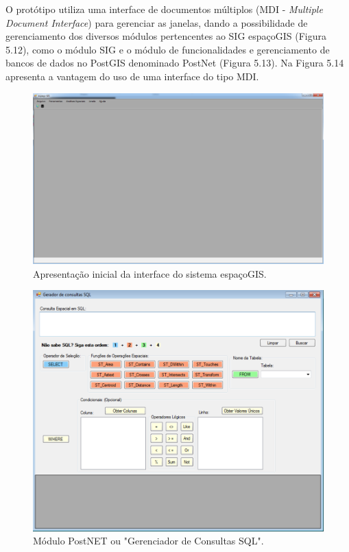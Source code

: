 O protótipo utiliza uma interface de documentos múltiplos (MDI - \textit{Multiple Document Interface}) para gerenciar as janelas, dando a possibilidade de gerenciamento dos diversos módulos pertencentes ao SIG espaçoGIS (Figura 5.12), como o módulo SIG e o módulo de funcionalidades e gerenciamento de bancos de dados no PostGIS denominado PostNet (Figura 5.13). Na Figura 5.14 apresenta a vantagem do uso de uma interface do tipo MDI.

	\begin{figure}
		\centering
		\includegraphics[width=0.8\linewidth]{data/espacoGIS_gui}
		\caption{Apresentação inicial da interface do sistema espaçoGIS.}
		\label{fig:espacogisgui}
	\end{figure}
	
	\begin{figure}
		\centering
		\includegraphics[width=1\linewidth]{data/postnet_gui}
		\caption{Módulo PostNET ou "Gerenciador de Consultas SQL".}
		\label{fig:postnetgui}
	\end{figure}

